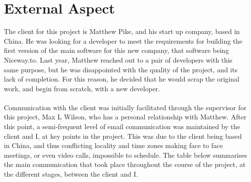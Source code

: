 \section{External Aspect}

The client for this project is Matthew Pike, and his start up company, based in China. He was looking for a developer to meet the requirements for building the first version of the main software for this new company, that software being Niceway.to. Last year, Matthew reached out to a pair of developers with this same purpose, but he was disappointed with the quality of the project, and its lack of completion. For this reason, he decided that he would scrap the original work, and begin from scratch, with a new developer.\ \\
\ \\
Communication with the client was initially facilitated through the supervisor for this project, Max L Wilson, who has a personal relationship with Matthew. After this point, a semi-frequent level of email communication was maintained by the client and I, at key points in the project. This was due to the client being based in China, and thus conflicting locality and time zones making face to face meetings, or even video calls, impossible to schedule. The table below summarises the main communication that took place throughout the course of the project, at the different stages, between the client and I.

